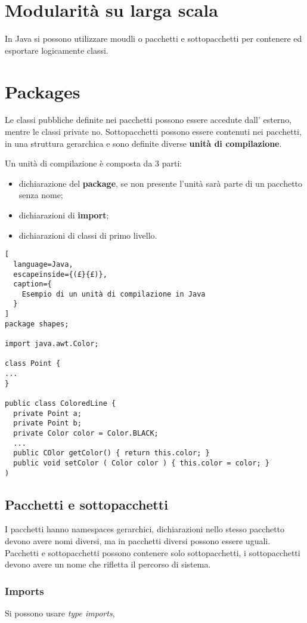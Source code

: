 \section{Modularità su larga scala}
In Java si possono utilizzare moudli o pacchetti e sottopacchetti per contenere
ed esportare logicamente classi.

\section{Packages}
Le classi pubbliche definite nei pacchetti possono essere accedute dall' 
esterno, mentre le classi private no.
Sottopacchetti possono essere contenuti nei pacchetti, in una struttura 
gerarchica e sono definite diverse \textbf{unità di compilazione}.

Un unità di compilazione è composta da $3$ parti:
\begin{itemize}
  \item dichiarazione del \textbf{package}, se non presente l'unità sarà parte 
    di un pacchetto senza nome;
  \item dichiarazioni di \textbf{import};
  \item dichiarazioni di classi di primo livello.
\end{itemize}

\begin{lstlisting}[
  language=Java,
  escapeinside={(£}{£)},
  caption={
    Esempio di un unità di compilazione in Java
  }
]
package shapes;

import java.awt.Color;

class Point {
...
}

public class ColoredLine {
  private Point a;
  private Point b;
  private Color color = Color.BLACK;
  ...
  public COlor getColor() { return this.color; }
  public void setColor ( Color color ) { this.color = color; }
)
\end{lstlisting}

\subsection{Pacchetti e sottopacchetti}
I pacchetti hanno namespaces gerarchici, dichiarazioni nello stesso pacchetto
devono avere nomi diversi, ma in pacchetti diversi possono essere uguali.
Pacchetti e sottopacchetti possono contenere solo sottopacchetti, i 
sottopacchetti devono avere un nome che rifletta il percorso di sistema.

\subsubsection{Imports}
Si possono usare \emph{type imports}, 


